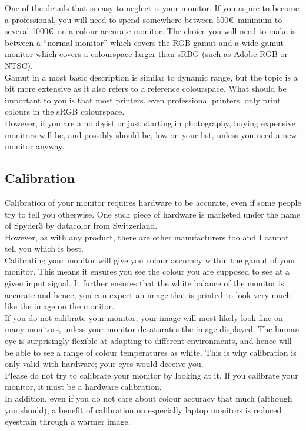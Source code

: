 One of the details that is easy to neglect is your monitor. If you aspire to become a professional, you will need to spend somewhere between 500\euro\ minimum to several 1000\euro\ on a colour accurate monitor. The choice you will need to make is between a ``normal monitor'' which covers the RGB gamut and a wide gamut monitor which covers a \gls{colourspace} larger than sRBG (such as Adobe RGB or NTSC).
\\
Gamut in a most basic description is similar to dynamic range, but the topic is a bit more extensive as it also refers to a reference \gls{colourspace}. What should be important to you is that most printers, even professional printers, only print colours in the sRGB \gls{colourspace}.
\\
However, if you are a hobbyist or just starting in photography, buying expensive monitors will be, and possibly should be, low on your list, unless you need a new monitor anyway.


\subsection{Calibration}

Calibration of your monitor requires hardware to be accurate, even if some people try to tell you otherwise. One such piece of hardware is marketed under the name of Spyder3 by datacolor from Switzerland. 
\\
However, as with any product, there are other manufacturers too and I cannot tell you which is best.
\\
Calibrating your monitor will give you colour accuracy within the gamut of your monitor. This means it ensures you see the colour you are supposed to see at a given input signal. It further ensures that the white balance of the monitor is accurate and hence, you can expect an image that is printed to look very much like the image on the monitor.
\\
If you do not calibrate your monitor, your image will most likely look fine on many monitors, unless your monitor desaturates the image displayed. The human eye is surprisingly flexible at adapting to different environments, and hence will be able to see a range of colour temperatures as white. This is why calibration is only valid with hardware; your eyes would deceive you.
\\
Please do not try to calibrate your monitor by looking at it. If you calibrate your monitor, it must be a hardware calibration.
\\[\baselineskip]
In addition, even if you do not care about colour accuracy that much (although you should), a benefit of calibration on especially laptop monitors is reduced eyestrain through a warmer image.

